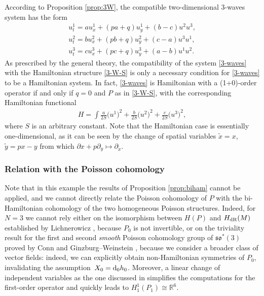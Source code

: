 \documentclass[10pt,a4paper]{amsart}
\numberwithin{equation}{section}
\begin{document}
According to Proposition \ref{prop:3W}, the compatible two-dimensional 3-waves system has the form
\begin{gather}
u^1_t=au^1_x+(pa+q)u^1_y+(b-c)u^2u^3,\nonumber\\
u^2_t=bu^2_x+(pb+q)u^2_y+(c-a)u^3u^1,\nonumber\\
u^3_t=cu^3_x+(pc+q)u^3_y+(a-b)u^1u^2.\label{eq:3W-sol}
\end{gather}
As prescribed by the general theory, the compatibility of the system \eqref{3-waves} with the Hamiltonian structure \eqref{3-W-S} is only a necessary condition for \eqref{3-waves} to be a Hamiltonian system. In fact, \eqref{3-waves} is Hamiltonian with a (1+0)-order operator if and only if $q=0$
and $P$ as in \eqref{3-W-S}, with the corresponding Hamiltonian functional
\begin{gather*}%
H=\int \frac{a}{2S}{\big(u^1\big)}^2+\frac{b}{2S}{\big(u^2\big)}^2+\frac{c}{2S}{\big(u^3\big)}^2,
\end{gather*}
where $S$ is an arbitrary constant. Note that the Hamiltonian case is essentially one-dimensional, as it can be seen by the change of spatial variables $\tilde{x}=x$, $\tilde{y}=p x -y$ from which $\partial x+p\partial_y\mapsto\partial_{\tilde{x}}$.

\subsubsection{Relation with the Poisson cohomology}
Note that in this example the results of Proposition \ref{prop:biham} cannot be applied, and we cannot directly relate the Poisson cohomology of $P$ with the bi-Hamiltonian cohomology of the two homogeneous Poisson structures. Indeed, for $N=3$ we cannot rely either on the isomorphism between $H(P)$ and $H_{\rm dR}(M)$ established by Lichnerowicz \cite{lichnerowicz1977varietes}, because $P_0$ is not invertible, or on the triviality result for the first and second \emph{smooth} Poisson cohomology group of $\mathfrak{so}^*(3)$ proved by Conn \cite{conn85} and Ginzburg--Weinstein \cite{gw92}, because we consider a broader class of vector fields: indeed, we can explicitly obtain non-Hamiltonian symmetries of $P_0$, invalidating the assumption~${X_0={\rm d}_0h_0}$. Moreover, a linear change of independent variables as the one discussed in \cite{ccs17} simplifies the computations for the first-order operator and quickly leads to $H^1_1(P_1)\cong\mathbb{R}^6$.
\end{document}
